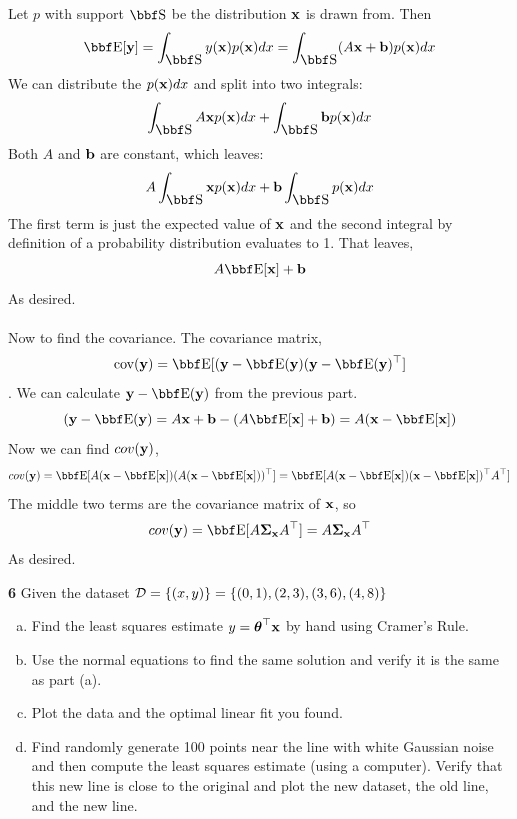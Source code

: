 \documentclass[12pt,letterpaper,fleqn]{hmcpset}
\begin{document}
\vspace{10mm}

Let $p$ with support $\SS$ be the distribution ${\bf x}$ is drawn from. Then
	$$\EE[\yy] = \int_{\SS} y(\xx) p(\xx)dx = \int_{\SS} (A\xx + \bb) p(\xx)dx$$
We can distribute the $p({\bf x})dx$ and split into two integrals:
	$$\int_{\SS} A\xx p(\xx)dx + \int_{\SS} \bb p(\xx)dx$$
Both $A$ and ${\bf b}$ are constant, which leaves:
	$$A \int_{\SS} \xx p(\xx)dx + \bb \int_{\SS}  p(\xx)dx$$
The first term is just the expected value of ${\bf x}$ and the second integral by definition of a probability distribution evaluates to 1. That leaves,
	$$A\EE[\xx] + \bb$$
As desired.\\\\

Now to find the covariance. The covariance matrix,
    $$\cov(\yy) = \EE[(\yy - \EE(\yy)(\yy - \EE(\yy)^\T]$$. 
We can calculate $\yy - \EE(\yy)$ from the previous part.
    $$(\yy - \EE(\yy) = A\xx + \bb - (A\EE[\xx] + \bb) = A(\xx - \EE[\xx])$$
Now we can find $cov({\bf y})$,
    $$cov(\yy) = \EE[A(\xx - \EE[\xx])(A(\xx - \EE[\xx]))^\T] = \EE[A(\xx - \EE[\xx])(\xx - \EE[\xx])^\T A^\T]$$
The middle two terms are the covariance matrix of ${\bf x}$, so
    $$cov(\yy) = \EE[A\Sigmab_\xx A^\T] = A\Sigmab_\xx A^\T$$
As desired.


\newpage



\textbf{6} Given the dataset ${\cal D} = \{(x,y)\} = \{(0,1), (2,3), (3,6), (4,8)\}$
\begin{enumerate}[(a)]
    \item Find the least squares estimate $y = \hbox{\boldmath$\theta$}^\top{\bf x}$ by hand using
        Cramer's Rule.
    \item Use the normal equations to find the same solution and verify it
        is the same as part (a).
    \item Plot the data and the optimal linear fit you found.
    \item Find randomly generate 100 points near the line with white Gaussian
        noise and then compute the least squares estimate (using a computer).
        Verify that this new line is close to the original and plot the new
        dataset, the old line, and the new line.
\end{enumerate}

\vspace{15mm}
\end{document}
